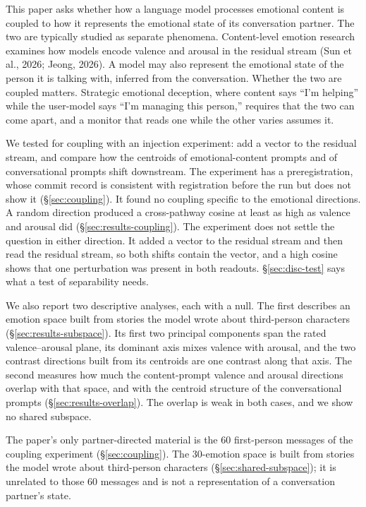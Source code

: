 \documentclass[11pt,a4paper]{article}
\begin{document}
This paper asks whether how a language model processes emotional content is coupled to how it represents the emotional state of its conversation partner. The two are typically studied as separate phenomena. Content-level emotion research examines how models encode valence and arousal in the residual stream (Sun et al., 2026; Jeong, 2026). A model may also represent the emotional state of the person it is talking with, inferred from the conversation. Whether the two are coupled matters. Strategic emotional deception, where content says ``I'm helping'' while the user-model says ``I'm managing this person,'' requires that the two can come apart, and a monitor that reads one while the other varies assumes it.

We tested for coupling with an injection experiment: add a vector to the residual stream, and compare how the centroids of emotional-content prompts and of conversational prompts shift downstream. The experiment has a preregistration, whose commit record is consistent with registration before the run but does not show it (\S\ref{sec:coupling}). It found no coupling specific to the emotional directions. A random direction produced a cross-pathway cosine at least as high as valence and arousal did (\S\ref{sec:results-coupling}). The experiment does not settle the question in either direction. It added a vector to the residual stream and then read the residual stream, so both shifts contain the vector, and a high cosine shows that one perturbation was present in both readouts. \S\ref{sec:disc-test} says what a test of separability needs.

We also report two descriptive analyses, each with a null. The first describes an emotion space built from stories the model wrote about third-person characters (\S\ref{sec:results-subspace}). Its first two principal components span the rated valence--arousal plane, its dominant axis mixes valence with arousal, and the two contrast directions built from its centroids are one contrast along that axis. The second measures how much the content-prompt valence and arousal directions overlap with that space, and with the centroid structure of the conversational prompts (\S\ref{sec:results-overlap}). The overlap is weak in both cases, and we show no shared subspace.

The paper's only partner-directed material is the 60 first-person messages of the coupling experiment (\S\ref{sec:coupling}). The 30-emotion space is built from stories the model wrote about third-person characters (\S\ref{sec:shared-subspace}); it is unrelated to those 60 messages and is not a representation of a conversation partner's state.
\end{document}
